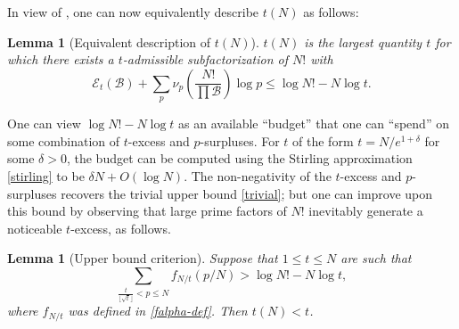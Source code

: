 \documentclass[12pt,a4paper,reqno]{amsart}
\numberwithin{equation}{section}
\theoremstyle{plain}
\newtheorem{lemma}[theorem]{Lemma}
\theoremstyle{definition}
\newcommand\tuple{{\mathcal B}}
\newcommand\excess{{\mathcal{E}}}
\begin{document}
In view of , one can now equivalently describe 
$t(N)$ as follows:

\begin{lemma}[Equivalent description of $t(N)$]\label{t-descrip}  $t(N)$ is the largest quantity $t$ for which there exists a $t$-admissible subfactorization of $N!$ with
$$ \excess_t(\tuple) + \sum_p \nu_p\left( \frac{N!}{\prod \tuple} \right) \log p \leq \log N! - N \log t.$$
\end{lemma}

One can view $\log N! - N\log t$ as an available ``budget'' that one can ``spend'' on some combination of $t$-excess and $p$-surpluses.  For $t$ of the form $t = N/e^{1+\delta}$ for some $\delta>0$, the budget can be computed using the Stirling approximation \eqref{stirling} to be $\delta N + O(\log N)$.  The non-negativity of the $t$-excess and $p$-surpluses recovers the trivial upper bound \eqref{trivial}; but one can improve upon this bound by observing that large prime factors of $N!$ inevitably generate a noticeable $t$-excess, as follows.  

\begin{lemma}[Upper bound criterion]\label{upper-crit}  Suppose that $1 \leq t \leq N$ are such that
  \begin{equation}\label{contra}
     \sum_{\frac{t}{\lfloor\sqrt{t}\rfloor} < p \leq N} f_{N/t}(p/N) > \log N! - N \log t,
  \end{equation}
  where $f_{N/t}$ was defined in \eqref{falpha-def}.
  Then $t(N) < t$.
  \end{lemma}
\end{document}
